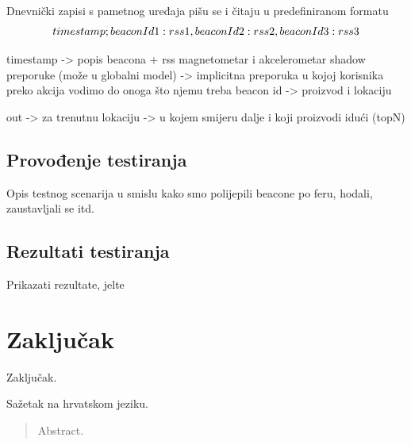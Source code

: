 \documentclass[times, utf8, diplomski, numeric]{fer}
\begin{document}
Dnevnički zapisi  s pametnog uređaja pišu se i čitaju u predefiniranom
formatu
\begin{equation}
	\centering
	timestamp;beaconId1:rss1,beaconId2:rss2,beaconId3:rss3
\end{equation}

timestamp -> popis beacona + rss
magnetometar i akcelerometar
shadow preporuke (može u globalni model) -> implicitna preporuka u kojoj korisnika
preko akcija vodimo do onoga što njemu treba
beacon id -> proizvod i lokaciju

out -> za trenutnu lokaciju -> u kojem smijeru dalje i koji proizvodi idući (topN)

\section{Provođenje testiranja}
Opis testnog scenarija u smislu kako smo polijepili beacone po feru, hodali,
zaustavljali se itd.
\section{Rezultati testiranja}
Prikazati rezultate, jelte

\chapter{Zaključak}
Zaključak.




\begin{sazetak}
Sažetak na hrvatskom jeziku.

\end{sazetak}

\begin{abstract}
Abstract.

\end{abstract}
\end{document}
